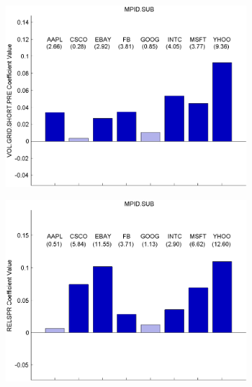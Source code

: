 \documentclass{article}
\begin{document}
\begin{figure}[htp!]
\caption{Coefficients from Firm-Level Regressions} \label{indreg1}

\begin{subfigure}{0.31\textwidth}
\includegraphics[width=\linewidth]{docs/Regression_Ratio_30sec_1_VOL_GRID_SHORT_PRE.pdf}
\end{subfigure}
\hspace*{\fill}
\begin{subfigure}{0.31\textwidth}
\includegraphics[width=\linewidth]{docs/Regression_Ratio_30sec_1_RELSPR.pdf}
\end{subfigure}

\end{figure}
\end{document}
